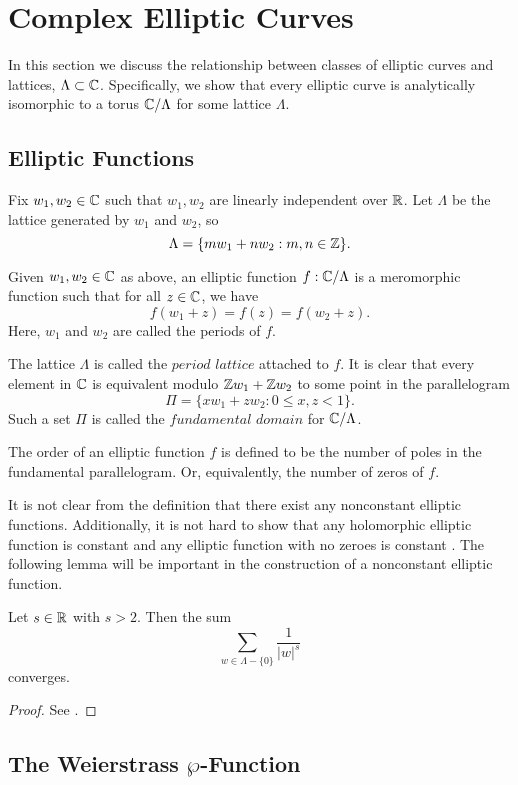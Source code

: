 \chapter{Complex Elliptic Curves} \label{complexellipticcurves}
In this section we discuss the relationship between classes of elliptic curves and lattices, $\Lambda \subset \mathbb{C}$. Specifically, we show that every elliptic curve is analytically isomorphic to a torus $\mathbb{C}/\Lambda$ for some lattice $\Lambda$. 

\section{Elliptic Functions}
Fix $w_1,w_2 \in \mathbb{C}$ such that $w_1, w_2$ are linearly independent over $\mathbb{R}$. Let $\Lambda$ be the lattice generated by $w_1$ and $w_2$, so
$$\Lambda = \{mw_1 + nw_2 : m,n \in \mathbb{Z}\}.$$

\begin{definition} Given $w_1, w_2 \in \mathbb{C}$ as above, an elliptic function $f:\mathbb{C}/\Lambda$ is a meromorphic function such that for all $z \in \mathbb{C}$, we have
$$f(w_1 + z) = f(z) = f(w_2 +z).$$
Here, $w_1$ and $w_2$ are called the periods of $f$.
\end{definition}
The lattice $\Lambda$ is called the $period$ $lattice$ attached to $f$. It is clear that every element in $\mathbb{C}$ is equivalent modulo $\mathbb{Z} w_1 + \mathbb{Z} w_2$ to some point in the parallelogram 
$$\Pi = \{ xw_1 + zw_2 : 0 \leq x,z < 1 \}.$$
Such a set $\Pi$ is called the $fundamental$ $domain$ for $\mathbb{C}/\Lambda$. 
\begin{definition}
The order of an elliptic function $f$ is defined to be the number of poles in the fundamental parallelogram. Or, equivalently, the number of zeros of $f$.
\end{definition}
It is not clear from the definition that there exist any nonconstant elliptic functions. Additionally, it is not hard to show that any holomorphic elliptic function is constant and any elliptic function with no zeroes is constant \cite[Page 161]{Silverman}. The following lemma will be important in the construction of a nonconstant elliptic function.
\begin{lem}\label{sumconvergence}
Let $s \in \mathbb{R}$ with $s > 2$. Then the sum
$$\sum_{w\in \Lambda - \{0\}}\frac{1}{|w|^s}$$
converges.
\end{lem}
\begin{proof}
See \cite[Page 154]{Knapp}.
\end{proof}

\section{The Weierstrass $\wp$-Function}\label{weierstrass p-function}

